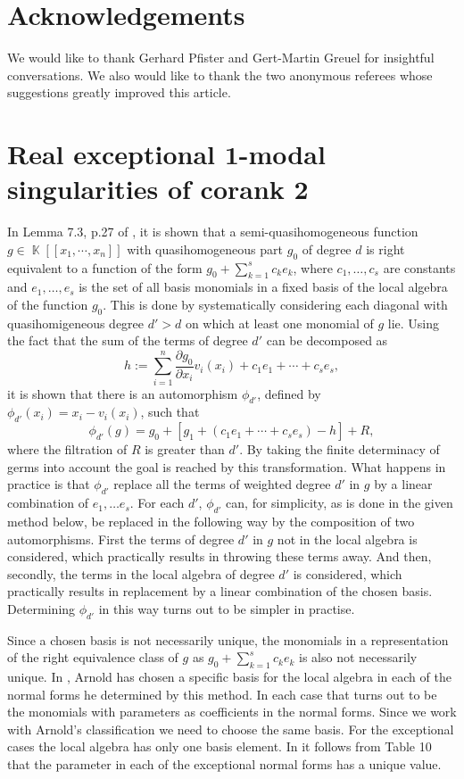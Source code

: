 \documentclass[noend]{amsproc}
\theoremstyle{definition}
\DeclareMathOperator{\K}{\mathbb{K}}
\begin{document}
\section{Acknowledgements}

We would like to thank Gerhard Pfister and Gert-Martin Greuel for insightful
conversations. We also would like to thank the two anonymous referees whose
suggestions greatly improved this article.

\section{Real exceptional $\mathbf 1$-modal singularities of corank $\mathbf 2$}
\label{ExceptionalSingularities}
In Lemma 7.3, p.27 of \citet{A1974}, it is shown that a semi-quasihomogeneous function $g\in\K[[x_1,\cdots,x_n]]$ with quasihomogeneous part $g_0$ of degree $d$ is right equivalent to a function of the form $g_0+\sum_{k=1}^s c_ke_k$, where $c_1,\ldots, c_s$ are constants and $e_1,\ldots,e_s$ is the set of all basis monomials in a fixed basis of the local algebra of the function $g_0$. This is done by systematically considering each diagonal with quasihomigeneous degree $d'>d$ on which at least one monomial of $g$ lie. Using the fact that the sum of the terms of degree $d'$ can be decomposed as
\[h:=\sum_{i=1}^n\frac{\partial g_0}{\partial x_i}v_i(x_i)+c_1e_1+\cdots+c_se_s,\]
it is shown that there is an automorphism $\phi_{d'}$, defined by $\phi_{d'}(x_i)=x_i-v_i(x_i)$, such that
\[\phi_{d'}(g)=g_0+[g_1+(c_1e_1+\cdots +c_se_s)-h]+R,\]
where the filtration of $R$ is greater than $d'$. By taking the finite determinacy of germs into account the goal is reached by this transformation. What happens in practice is that $\phi_{d'}$ replace all the terms of weighted degree $d'$ in $g$ by a linear combination of $e_1,\ldots e_s$. For each $d'$, $\phi_{d'}$ can, for simplicity, as is done in the given method below, be replaced in the following way by the composition of two automorphisms. First the terms of degree $d'$ in $g$ not in the local algebra is considered, which practically results in throwing these terms away. And then, secondly, the terms in the local algebra of degree $d'$ is considered, which practically results in replacement by a linear combination of the chosen basis. Determining $\phi_{d'}$ in this way turns out to be simpler in practise.

Since a chosen basis is not necessarily unique, the monomials in a representation of the right equivalence class of $g$ as $g_0+\sum_{k=1}^s c_ke_k$ is also not necessarily unique. In \cite{A1974}, Arnold has chosen a specific basis for the local algebra in each of the normal forms he determined by this method. In each case that turns out to be the monomials with parameters as coefficients in the normal forms. Since we work with Arnold's classification we need to choose the same basis. For the exceptional cases the local algebra has only one basis element. In \cite{realclassify2} it follows from Table 10 that the parameter in each of the exceptional normal forms has a unique value. 
\end{document}
